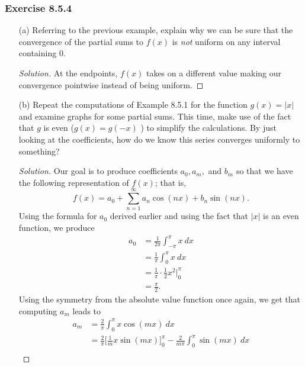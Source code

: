 \subsubsection{Exercise 8.5.4} 
\begin{enumerate}
    \item[(a)] Referring to the previous example, explain why we can be sure that the convergence of the partial sums to \( f(x)  \) is \textit{not} uniform on any interval containing \( 0  \).
        \begin{proof}[Solution]
        At the endpoints, \( f(x)  \) takes on a different value making our convergence pointwise instead of being uniform.
        \end{proof}
    \item[(b)] Repeat the computations of Example 8.5.1 for the function \( g(x) = | x |  \) and examine graphs for some partial sums. This time, make use of the fact that \( g  \) is even (\( g(x) = g(-x) \) ) to simplify the calculations. By just looking at the coefficients, how do we know this series converges uniformly to something?
        \begin{proof}[Solution]
            Our goal is to produce coefficients \( a_{0}, a_{m},   \) and \( b_{m} \) so that we have the following representation of \( f(x)  \); that is, 
            \[  f(x) = a_{0} + \sum_{ n=1 }^{ \infty  } a_{n} \cos(nx) + b_{n} \sin(nx). \] Using the formula for \( a_{0} \) derived earlier and using the fact that \( | x  |  \) is an even function, we produce 
            \begin{align*}
                a_{0} &= \frac{ 1 }{ 2 \pi  } \int_{ -\pi  }^{ \pi  } x \ dx \\
                      &= \frac{ 1 }{ \pi  } \int_{ 0  }^{ \pi  } x  \ dx \\
                      &= \frac{ 1 }{ \pi  } \cdot \frac{ 1 }{ 2  } x^{2} \Big|_{0}^{\pi } \\
                      &= \frac{ \pi  }{ 2 }.
            \end{align*}
            Using the symmetry from the absolute value function once again, we get that computing \( a_{m} \) leads to
            \begin{align*}
                a_{m} &= \frac{ 2 }{ \pi } \int_{ 0 }^{ \pi } x \cos(mx)  \ dx \\
                      &= \frac{ 2 }{ \pi  } \Big[ \frac{ 1 }{ m } x\sin(mx)    \Big]_{0}^{\pi} - \frac{ 2 }{m \pi  } \int_{ 0 }^{ \pi  } \sin(mx) \ dx \\   

\end{align*}
\end{proof}
\end{enumerate}
